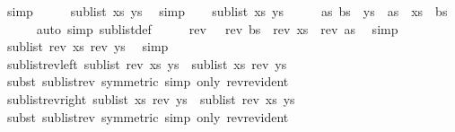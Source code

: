 \begin{isabellebody}
\ simp\isanewline
\ \ \isamarkupfalse%
\ \isamarkupfalse%
\ {\isachardoublequoteopen}sublist\ xs\ ys{\isachardoublequoteclose}\ \isamarkupfalse%
\ simp\isanewline
{}\isamarkupfalse%
\isanewline
\ \ \isamarkupfalse%
\ {\isachardoublequoteopen}sublist\ xs\ ys{\isachardoublequoteclose}\isanewline
\ \ \isamarkupfalse%
\ \isamarkupfalse%
\ as\ bs\ \ {\isachardoublequoteopen}ys\ {\isacharequal}\ as\ {\isacharat}\ xs\ {\isacharat}\ bs{\isachardoublequoteclose}\isanewline
\ \ \ \ \isamarkupfalse%
\ {\isacharparenleft}auto\ simp{\isacharcolon}\ sublist{\isacharunderscore}def{\isacharparenright}\isanewline
\ \ \isamarkupfalse%
\ \isamarkupfalse%
\ {\isachardoublequoteopen}rev\ {\isasymdots}\ {\isacharequal}\ rev\ bs\ {\isacharat}\ rev\ xs\ {\isacharat}\ rev\ as{\isachardoublequoteclose}\ \isamarkupfalse%
\ simp\isanewline
\ \ \isamarkupfalse%
\ \isamarkupfalse%
\ {\isachardoublequoteopen}sublist\ {\isacharparenleft}rev\ xs{\isacharparenright}\ {\isacharparenleft}rev\ ys{\isacharparenright}{\isachardoublequoteclose}\ \isamarkupfalse%
\ simp\isanewline
{}\isamarkupfalse%
%
\endisatagproof
{\isafoldproof}%
%
\isadelimproof
\isanewline
%
\endisadelimproof
\ \ \ \ \isanewline
{}\isamarkupfalse%
\ sublist{\isacharunderscore}rev{\isacharunderscore}left{\isacharcolon}\ {\isachardoublequoteopen}sublist\ {\isacharparenleft}rev\ xs{\isacharparenright}\ ys\ {\isacharequal}\ sublist\ xs\ {\isacharparenleft}rev\ ys{\isacharparenright}{\isachardoublequoteclose}\isanewline
%
\isadelimproof
\ \ %
\endisadelimproof
%
\isatagproof
{}\isamarkupfalse%
\ {\isacharparenleft}subst\ sublist{\isacharunderscore}rev\ {\isacharbrackleft}symmetric{\isacharbrackright}{\isacharparenright}\ {\isacharparenleft}simp\ only{\isacharcolon}\ rev{\isacharunderscore}rev{\isacharunderscore}ident{\isacharparenright}%
\endisatagproof
{\isafoldproof}%
%
\isadelimproof
\isanewline
%
\endisadelimproof
\ \ \ \ \isanewline
{}\isamarkupfalse%
\ sublist{\isacharunderscore}rev{\isacharunderscore}right{\isacharcolon}\ {\isachardoublequoteopen}sublist\ xs\ {\isacharparenleft}rev\ ys{\isacharparenright}\ {\isacharequal}\ sublist\ {\isacharparenleft}rev\ xs{\isacharparenright}\ ys{\isachardoublequoteclose}\isanewline
%
\isadelimproof
\ \ %
\endisadelimproof
%
\isatagproof
{}\isamarkupfalse%
\ {\isacharparenleft}subst\ sublist{\isacharunderscore}rev\ {\isacharbrackleft}symmetric{\isacharbrackright}{\isacharparenright}\ {\isacharparenleft}simp\ only{\isacharcolon}\ rev{\isacharunderscore}rev{\isacharunderscore}ident{\isacharparenright}%

\end{isabellebody}
